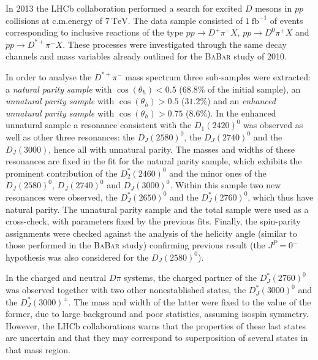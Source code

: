 In 2013 the LHCb collaboration performed a search for excited $D$ mesons in $p p$ collisions at c.m.\@ energy of $7 \ \text{TeV}$. The data sample consisted of $1 \ \text{fb}^{-1}$ of events corresponding to inclusive reactions of the type $p p \to D^+ \pi^- X$, $p p \to D^0 \pi^+ X$ and $p p \to D^{* +} \pi^- X$. These processes were investigated through the same decay channels and mass variables already outlined for the \textsc{BaBar} study of 2010.

In order to analyse the $D^{* +} \pi^-$ mass spectrum three sub-samples were extracted: a \emph{natural parity sample} with $\cos{(\theta_h)}< 0.5$ ($68.8\%$ of the initial sample), an \emph{unnatural parity sample} with $\cos{(\theta_h)}> 0.5$ ($31.2\%$) and an \emph{enhanced unnatural parity sample} with $\cos{(\theta_h)}> 0.75$ ($8.6 \%$). In the enhanced unnatural sample a resonance consistent with the $D_1(2420)^0$ was observed as well as other three resonances: the $D_J(2580)^0$, the $D_J(2740)^0$ and the $D_J(3000)$, hence all with unnatural parity. The masses and widths of these resonances are fixed in the fit for the natural parity sample, which exhibits the prominent contribution of the $D^*_2(2460)^0$ and the minor ones of the $D_J(2580)^0$, $D_J(2740)^0$ and $D_J(3000)^0$. Within this sample two new resonances were observed, the $D^*_J(2650)^0$ and the $D^*_J(2760)^0$, which thus have natural parity. The unnatural parity sample and the total sample were used as a cross-check, with parameters fixed by the previous fits. Finally, the spin-parity assignments were checked against the analysis of the helicity angle (similar to those performed in the \textsc{BaBar} study) confirming previous result (the $J^P = 0^-$ hypothesis was also considered for the $D_J(2580)^0$).

In the charged and neutral $D \pi$ systems, the charged partner of the $D^*_J(2760)^0$ was observed together with two other nonestablished states, the $D^*_J(3000)^0$ and the $D^*_J(3000)^\pm$. The mass and width of the latter were fixed to the value of the former, due to large background and poor statistics, assuming isospin symmetry. However, the LHCb collaborations warns that the properties of these last states are uncertain and that they may correspond to superposition of several states in that mass region.

